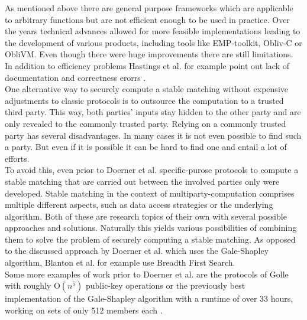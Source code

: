 As mentioned above there are general purpose frameworks which are applicable to arbitrary functions but are not efficient enough to be used in practice. Over the years technical advances allowed for more feasible implementations leading to the development of various products, including tools like EMP-toolkit, Obliv-C or ObliVM. Even though there were huge improvements there are still limitations. In addition to efficiency problems Hastings et al.  for example point out lack of documentation and correctness erorrs . \\
One alternative way to securely compute a stable matching without expensive adjustments to classic protocols is to outsource the computation to a trusted third party. This way, both parties' inputs stay hidden to the other party and are only revealed to the commonly trusted party.
Relying on a commonly trusted party has several disadvantages. In many cases it is not even possible to find such a party. But even if it is possible it can be hard to find one and entail a lot of efforts. \\
To avoid this, even prior to Doerner et al.  specific-purose protocols to compute a stable matching that are carried out between the involved parties only were developed. Stable matching in the context of multiparty-computation comprises multiple different aspects, such as data access strategies or the underlying algorithm. Both of these are research topics of their own with several possible approaches and solutions. Naturally this yields various possibilities of combining them to solve the problem of securely computing a stable matching. As opposed to the discussed approach by Doerner et al.  which uses the Gale-Shapley algorithm, Blanton et al.  for example use Breadth First Search. \\
Some more examples of work prior to Doerner et al.  are the protocols of Golle  with roughly O$(n^5)$ public-key operations  or the previously best implementation of the Gale-Shapley algorithm with a runtime of over 33 hours, working on sets of only 512 members each .